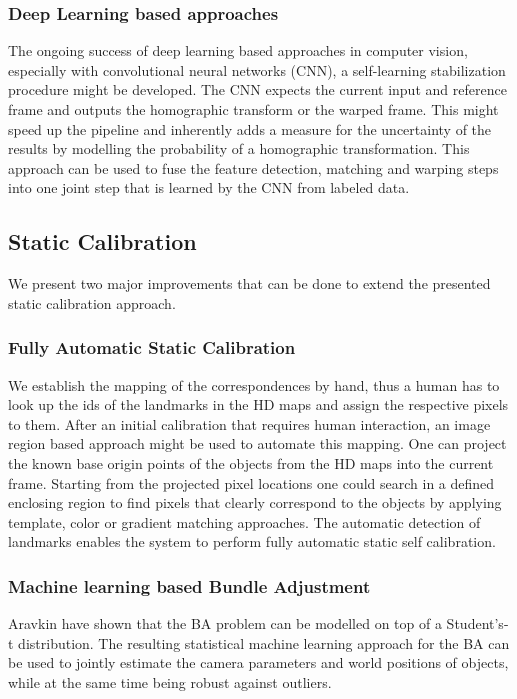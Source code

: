 \subsubsection{Deep Learning based approaches}
The ongoing success of deep learning based approaches in computer vision, especially with convolutional neural networks (CNN), a self-learning stabilization procedure might be developed.
The CNN expects the current input and reference frame and outputs the homographic transform or the warped frame. 
This might speed up the pipeline and inherently adds a measure for the uncertainty of the results by modelling the probability of a homographic transformation.
This approach can be used to fuse the feature detection, matching and warping steps into one joint step that is learned by the CNN from labeled data.


\subsection{Static Calibration}
We present two major improvements that can be done to extend the presented static calibration approach.

\subsubsection{Fully Automatic Static Calibration}
\label{sec:auto_mapping_landmarks}
We establish the mapping of the correspondences by hand, thus a human has to look up the ids of the landmarks in the HD maps and assign the respective pixels to them.
After an initial calibration that requires human interaction, an image region based approach might be used to automate this mapping.
One can project the known base origin points of the objects from the HD maps into the current frame.
Starting from the projected pixel locations one could search in a defined enclosing region to find pixels that clearly correspond to the objects by applying template, color or gradient matching approaches.
The automatic detection of landmarks enables the system to perform fully automatic static self calibration.

\subsubsection{Machine learning based Bundle Adjustment}
Aravkin \etal \cite{students_t_bundle_adjustment} have shown that the BA problem can be modelled on top of a Student's-t distribution. 
The resulting statistical machine learning approach for the BA can be used to jointly estimate the camera parameters and world positions of objects, while at the same time being robust against outliers.
  

